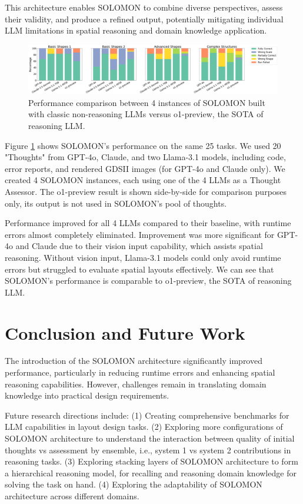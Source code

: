 \documentclass{article}
\begin{document}
This architecture enables SOLOMON to combine diverse perspectives, assess their validity, and produce a refined output, potentially mitigating individual LLM limitations in spatial reasoning and domain knowledge application.
\begin{figure}[h]
  \centering
  \includegraphics[width=\textwidth]{judges-performance.png}
  \caption{Performance comparison between 4 instances of SOLOMON built with classic non-reasoning LLMs versus o1-preview, the SOTA of reasoning LLM.}
  \label{fig:judges-performance}
\end{figure}
Figure \ref{fig:judges-performance} shows SOLOMON's performance on the same 25 tasks. We used 20 "Thoughts" from GPT-4o, Claude, and two Llama-3.1 models, including code, error reports, and rendered GDSII images (for GPT-4o and Claude only). We created 4 SOLOMON instances, each using one of the 4 LLMs as a Thought Assessor. The o1-preview result is shown side-by-side for comparison purposes only, its output is not used in SOLOMON's pool of thoughts.

Performance improved for all 4 LLMs compared to their baseline, with runtime errors almost completely eliminated. Improvement was more significant for GPT-4o and Claude due to their vision input capability, which assists spatial reasoning. Without vision input, Llama-3.1 models could only avoid runtime errors but struggled to evaluate spatial layouts effectively. We can see that SOLOMON's performance is comparable to o1-preview, the SOTA of reasoning LLM.

\section{Conclusion and Future Work}
The introduction of the SOLOMON architecture significantly improved performance, particularly in reducing runtime errors and enhancing spatial reasoning capabilities. However, challenges remain in translating domain knowledge into practical design requirements.

Future research directions include:
(1) Creating comprehensive benchmarks for LLM capabilities in layout design tasks.
(2) Exploring more configurations of SOLOMON architecture to understand the interaction between quality of initial thoughts vs assessment by ensemble, i.e., system 1 vs system 2 contributions in reasoning tasks.
(3) Exploring stacking layers of SOLOMON architecture to form a hierarchical reasoning model, for recalling and reasoning domain knowledge for solving the task on hand.
(4) Exploring the adaptability of SOLOMON architecture across different domains.
\end{document}
